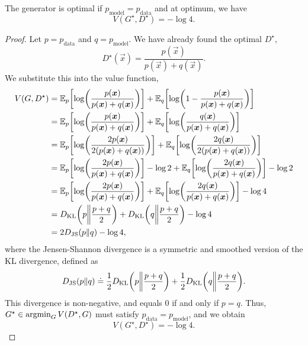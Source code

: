 \begin{theorem}
    \label{thm:generator-optimality}
    The generator is optimal if $p_{\mathrm{model}} = p_{\mathrm{data}}$ and at optimum, we have \[
        V(G^\star, D^\star) = -\log 4.
    \]
\end{theorem}

\begin{proof}
    Let $p = p_{\mathrm{data}}$ and $q = p_{\mathrm{model}}$. We have already found the optimal $D^\star$, \[
        D^\star(\vec{x}) = \frac{p(\vec{x})}{p(\vec{x}) + q(\vec{x})}.
    \]
    We substitute this into the value function,
    \begin{align*}
        V(G, D^\star) & = \E_p \lft[ \log \lft( \frac{p(\vec{x})}{p(\vec{x}) + q(\vec{x})} \rgt) \rgt] + \E_q \lft[ \log \lft( 1 - \frac{p(\vec{x})}{p(\vec{x}) + q(\vec{x})} \rgt) \rgt]                   \\
                      & = \E_p \lft[ \log \lft( \frac{p(\vec{x})}{p(\vec{x}) + q(\vec{x})} \rgt) \rgt] + \E_q \lft[ \log \lft( \frac{q(\vec{x})}{p(\vec{x}) + q(\vec{x})} \rgt) \rgt]                       \\
                      & = \E_p \lft[ \log \lft( \frac{2 p(\vec{x})}{2 (p(\vec{x}) + q(\vec{x}))} \rgt) \rgt] + \E_q \lft[ \log \lft( \frac{2 q(\vec{x})}{2 (p(\vec{x}) + q(\vec{x}))} \rgt) \rgt]           \\
                      & = \E_p \lft[ \log \lft( \frac{2 p(\vec{x})}{p(\vec{x}) + q(\vec{x})} \rgt) \rgt] - \log 2 + \E_q \lft[ \log \lft( \frac{2 q(\vec{x})}{p(\vec{x}) + q(\vec{x})} \rgt) \rgt] - \log 2 \\
                      & = \E_p \lft[ \log \lft( \frac{2 p(\vec{x})}{p(\vec{x}) + q(\vec{x})} \rgt) \rgt] + \E_q \lft[ \log \lft( \frac{2 q(\vec{x})}{p(\vec{x}) + q(\vec{x})} \rgt) \rgt] - \log 4          \\
                      & = D_{\mathrm{KL}} \lft( p \middle\lVert \frac{p + q}{2} \rgt) + D_{\mathrm{KL}} \lft( q \middle\lVert \frac{p + q}{2} \rgt) - \log 4                                                \\
                      & = 2 D_{\mathrm{JS}}(p \lVert q) - \log 4,
    \end{align*}
    where the Jensen-Shannon divergence is a symmetric and smoothed version of the KL divergence, defined as \[
        D_{\mathrm{JS}}(p \lVert q) \doteq \frac{1}{2} D_{\mathrm{KL}}\lft(p \middle\lVert \frac{p + q}{2} \rgt) + \frac{1}{2} D_{\mathrm{KL}}\lft( q \middle\lVert \frac{p + q}{2} \rgt).
    \]
    This divergence is non-negative, and equals 0 if and only if $p = q$. Thus, $G^\star \in \operatorname*{argmin}_G
        V(D^\star, G)$ must satisfy $p_{\mathrm{data}} = p_{\mathrm{model}}$, and we obtain \[
        V(G^\star, D^\star) = - \log 4.
    \]
\end{proof}

